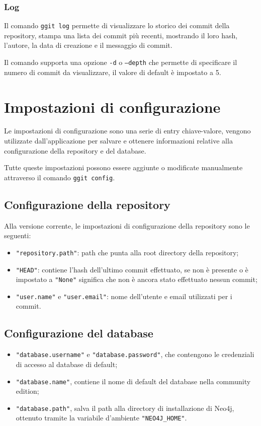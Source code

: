 \subsubsection{Log}
Il comando \texttt{ggit log} permette di visualizzare lo storico dei commit della repository, stampa una lista dei commit più recenti, mostrando il loro hash, l'autore, la data di creazione e il messaggio di commit.

Il comando supporta una opzione \texttt{-d} o \texttt{--depth} che permette di specificare il numero di commit da visualizzare, il valore di default è impostato a 5.

\section{Impostazioni di configurazione}
\label{sec:impostazioni}
Le impostazioni di configurazione sono una serie di entry chiave-valore, vengono utilizzate dall'applicazione per salvare e ottenere informazioni relative alla configurazione della repository e del database.

Tutte queste impostazioni possono essere aggiunte o modificate manualmente attraverso il comando \texttt{ggit config}.

\subsection{Configurazione della repository}
Alla versione corrente, le impostazioni di configurazione della repository sono le seguenti:
\begin{itemize}
    \item \texttt{"repository.path"}: path che punta alla root directory della repository;
    \item \texttt{"HEAD"}: contiene l'hash dell'ultimo commit effettuato, se non è presente o è impostato a \texttt{"None"} significa che non è ancora stato effettuato nessun commit;
    \item \texttt{"user.name"} e \texttt{"user.email"}: nome dell'utente e email utilizzati per i commit.
\end{itemize}

\subsection{Configurazione del database}
\begin{itemize}
    \item \texttt{"database.username"} e \texttt{"database.password"}, che contengono le credenziali di accesso al database di default;
    \item \texttt{"database.name"}, contiene il nome di default del database nella community edition;
    \item \texttt{"database.path"}, salva il path alla directory di installazione di Neo4j, ottenuto tramite la variabile d'ambiente \texttt{"NEO4J\_HOME"}.
\end{itemize}